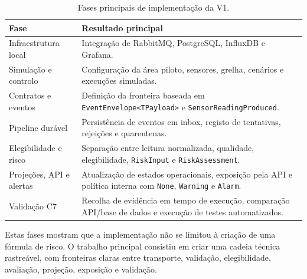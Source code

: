 \begin{table}[h]
\centering
\caption{Fases principais de implementação da V1.}
\label{tab:implementation-phases}
\begin{tabular}{p{} p{}}
\hline
\textbf{Fase} & \textbf{Resultado principal} \\
\hline
Infraestrutura local & Integração de RabbitMQ, PostgreSQL, InfluxDB e Grafana. \\
Simulação e controlo & Configuração da área piloto, sensores, grelha, cenários e execuções simuladas. \\
Contratos e eventos & Definição da fronteira baseada em \texttt{EventEnvelope<TPayload>} e \texttt{SensorReadingProduced}. \\
Pipeline durável & Persistência de eventos em inbox, registo de tentativas, rejeições e quarentenas. \\
Elegibilidade e risco & Separação entre leitura normalizada, qualidade, elegibilidade, \texttt{RiskInput} e \texttt{RiskAssessment}. \\
Projeções, API e alertas & Atualização de estados operacionais, exposição pela API e política interna com \texttt{None}, \texttt{Warning} e \texttt{Alarm}. \\
Validação C7 & Recolha de evidência em tempo de execução, comparação API/base de dados e execução de testes automatizados. \\
\hline
\end{tabular}
\end{table}

Estas fases mostram que a implementação não se limitou à criação de uma fórmula de risco. O trabalho principal consistiu em criar uma cadeia técnica rastreável, com fronteiras claras entre transporte, validação, elegibilidade, avaliação, projeção, exposição e validação.
